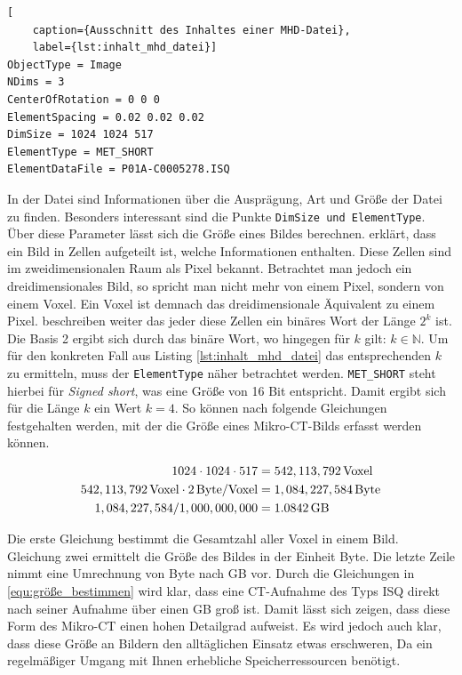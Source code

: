 \begin{lstlisting}[
	caption={Ausschnitt des Inhaltes einer MHD-Datei},
	label={lst:inhalt_mhd_datei}]
ObjectType = Image
NDims = 3
CenterOfRotation = 0 0 0
ElementSpacing = 0.02 0.02 0.02
DimSize = 1024 1024 517
ElementType = MET_SHORT
ElementDataFile = P01A-C0005278.ISQ
\end{lstlisting}

In der Datei sind Informationen über die Ausprägung, Art und Größe der Datei zu
finden. Besonders interessant sind die Punkte \texttt{DimSize und ElementType}. Über
diese Parameter lässt sich die Größe eines Bildes berechnen. \citet[S.~10-11]{burger2009}
erklärt, dass ein Bild in Zellen aufgeteilt ist, welche Informationen enthalten.
Diese Zellen sind im zweidimensionalen Raum als Pixel bekannt. Betrachtet man jedoch
ein dreidimensionales Bild, so spricht man nicht mehr von einem Pixel, sondern von
einem Voxel. Ein Voxel ist demnach das dreidimensionale Äquivalent zu einem
Pixel. \citet[S.~10-11]{burger2009} beschreiben weiter das jeder diese Zellen
ein binäres Wort der Länge $2^{k}$ ist. Die Basis 2 ergibt sich durch das binäre
Wort, wo hingegen für $k$ gilt: $k \in \mathbb{N}$. Um für den konkreten Fall
aus Listing \ref{lst:inhalt_mhd_datei} das entsprechenden $k$ zu ermitteln, muss
der \texttt{ElementType} näher betrachtet werden. \texttt{MET\_SHORT} steht
hierbei für \textit{Signed short}, was eine Größe von 16 Bit entspricht. Damit ergibt
sich für die Länge $k$ ein Wert $k = 4$. So können nach \citet[S.~10-11]{burger2009}
folgende Gleichungen festgehalten werden, mit der die Größe eines Mikro-\ac{CT}-Bilds
erfasst werden können.

\begin{align}
	\label{equ:größe_bestimmen}1024 \cdot 1024 \cdot 517    & = 542,113,792 \, \text{Voxel}\notag  \\
	542,113,792 \, \text{Voxel}\cdot 2 \, \text{Byte/Voxel} & = 1,084,227,584 \, \text{Byte}\notag \\
	1,084,227,584 / 1,000,000,000                           & = 1.0842 \, \text{GB}
\end{align}

Die erste Gleichung bestimmt die Gesamtzahl aller Voxel in einem Bild. Gleichung
zwei ermittelt die Größe des Bildes in der Einheit Byte. Die letzte Zeile nimmt
eine Umrechnung von Byte nach \ac{GB} vor. Durch die Gleichungen in
\ref{equ:größe_bestimmen} wird klar, dass eine \ac{CT}-Aufnahme des Typs \ac{ISQ}
direkt nach seiner Aufnahme über einen \ac{GB} groß ist. Damit lässt sich zeigen,
dass diese Form des Mikro-\ac{CT} einen hohen Detailgrad aufweist. Es wird
jedoch auch klar, dass diese Größe an Bildern den alltäglichen Einsatz etwas erschweren,
Da ein regelmäßiger Umgang mit Ihnen erhebliche Speicherressourcen benötigt.

